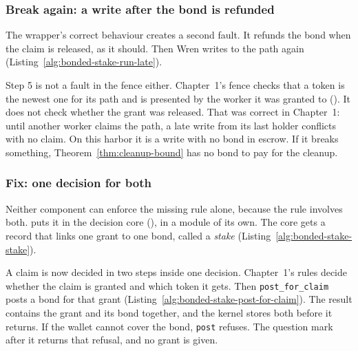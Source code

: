 \subsubsection{Break again: a write after the bond is refunded}

The wrapper's correct behaviour creates a second fault. It refunds the
bond when the claim is released, as it should. Then Wren writes to the
path again (Listing~\ref{alg:bonded-stake-run-late}).


Step 5 is not a fault in the fence either. Chapter~1's fence checks that a
token is the newest one for its path and is presented by the worker it was
granted to (). It does not check whether
the grant was released. That was correct in Chapter~1: until another
worker claims the path, a late write from its last holder conflicts with
no claim. On this harbor it is a write with no bond in escrow. If it
breaks something, Theorem~\ref{thm:cleanup-bound} has no bond to pay for
the cleanup.

\subsubsection{Fix: one decision for both}

Neither component can enforce the missing rule alone, because the rule
involves both. \pdkernelname{} puts it in the decision core
(), in a module of its own.
The core gets a record that links one grant to one bond, called a
\emph{stake} (Listing~\ref{alg:bonded-stake-stake}).


A claim is now decided in two steps inside one decision. Chapter~1's rules
decide whether the claim is granted and which token it gets. Then
\texttt{post\_for\_claim} posts a bond for that grant
(Listing~\ref{alg:bonded-stake-post-for-claim}). The result contains the
grant and its bond together, and the kernel stores both before it returns.
If the wallet cannot cover the bond, \texttt{post} refuses. The question
mark after it returns that refusal, and no grant is given.

